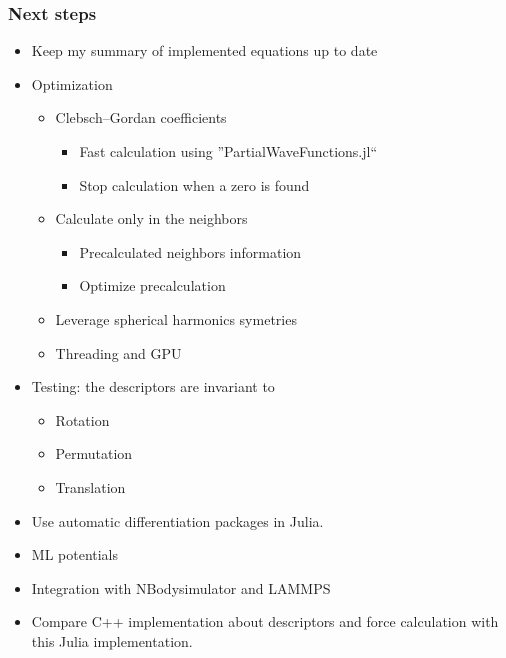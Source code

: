 \documentclass[10pt]{beamer}
\theoremstyle{remark}
\theoremstyle{definition}
\begin{document}
\begin{frame}
\frametitle{Next steps}
\small
\begin{itemize}
\item Keep my summary of implemented equations up to date \checkmark
\pause
\item Optimization
	\begin{itemize}
   	 \item Clebsch–Gordan coefficients
   	     \begin{itemize}
   	 		\item Fast calculation using ''PartialWaveFunctions.jl`` \checkmark
			\item Stop calculation when a zero is found \checkmark
    	\end{itemize} 
    \item Calculate only in the neighbors
        \begin{itemize}
    		\item Precalculated neighbors information \checkmark
    		\item Optimize precalculation
    	\end{itemize}
	\item Leverage spherical harmonics symetries
	\item Threading and GPU
	\end{itemize}
\pause
\item Testing: the descriptors are invariant to 
	\begin{itemize}
	 \item Rotation \checkmark
   	 \item Permutation
   	 \item Translation
\end{itemize}
\pause
\item Use automatic differentiation packages in Julia.
\pause
\item ML potentials
\pause
\item Integration with NBodysimulator and LAMMPS
\pause
\item Compare C++ implementation about descriptors and force calculation with this Julia implementation.
\end{itemize}


\end{frame}


\end{document}
